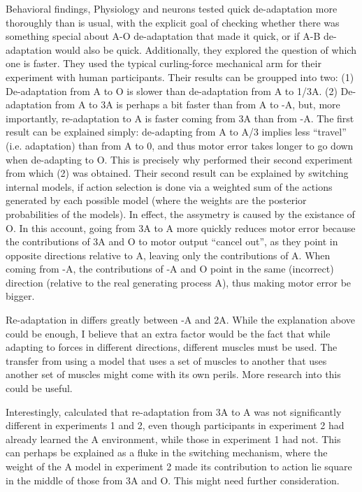 \documentclass{report}
\begin{document}
\begin{chapter}{Behavioral findings, Physiology and neurons}
\cite{Davidson_Scaling_2004} tested quick de-adaptation more thoroughly than is
usual, with the explicit goal of checking whether there was something special
about A-O de-adaptation that made it quick, or if A-B de-adaptation would also
be quick. Additionally, they explored the question of which one is faster. They
used the typical curling-force mechanical arm for their experiment with human
participants. Their results can be groupped into two: (1) De-adaptation from A
to O is slower than de-adaptation from A to 1/3A. (2) De-adaptation from A to
3A is perhaps a bit faster than from A to -A, but, more importantly,
re-adaptation to A is faster coming from 3A than from -A. The first result can
be explained simply: de-adapting from A to A/3 implies less ``travel''
(i.e. adaptation) than from A to 0, and thus motor error takes longer to go
down when de-adapting to O. This is precisely why \cite{Davidson_Scaling_2004}
performed their second experiment from which (2) was obtained. Their second
result can be explained by switching internal models, if action selection is
done via a weighted sum of the actions generated by each possible model (where
the weights are the posterior probabilities of the models). In effect, the
assymetry is caused by the existance of O. In this account, going from 3A to A
more quickly reduces motor error because the contributions of 3A and O to motor
output ``cancel out'', as they point in opposite directions relative to A,
leaving only the contributions of A. When coming from -A, the contributions of
-A and O point in the same (incorrect) direction (relative to the real
generating process A), thus making motor error be bigger.

Re-adaptation in \cite{Davidson_Scaling_2004} differs greatly between -A and
2A. While the explanation above could be enough, I believe that an extra factor
would be the fact that while adapting to forces in different directions,
different muscles must be used. The transfer from using a model that uses a set
of muscles to another that uses another set of muscles might come with its own
perils. More research into this could be useful.

Interestingly, \cite{Davidson_Scaling_2004} calculated that re-adaptation from
3A to A was not significantly different in experiments 1 and 2, even though
participants in experiment 2 had already learned the A environment, while those
in experiment 1 had not. This can perhaps be explained as a fluke in the
switching mechanism, where the weight of the A model in experiment 2 made its
contribution to action lie square in the middle of those from 3A and O. This
might need further consideration.


\end{chapter}
\end{document}
